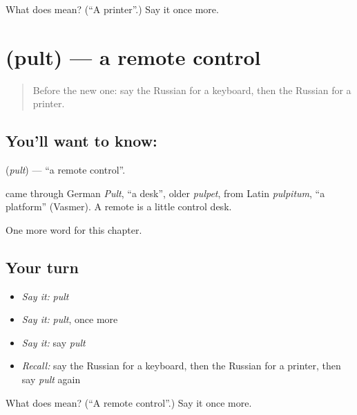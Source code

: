 \begin{tcolorbox}[breakable,colback=teal!4,colframe=teal!35!black,title={Before you move on}]
What does  mean? (\textquotedblleft{}A printer\textquotedblright{}.) Say it once more.
\end{tcolorbox}
\section[\texorpdfstring{\ru{пульт} (pult)}{пульт (pult)}]{ (pult) — a remote control}

\label{lesson:RU-C220-pult}



\begin{quote}
Before the new one: say the Russian for a keyboard, then the Russian for a printer.
\end{quote}

\subsection*{You'll want to know: }
\textbf{} (\emph{pult}) — \textquotedblleft{}a remote control\textquotedblright{}.

\begin{cousinweb}
\textbf{} came through German \emph{Pult}, \textquotedblleft{}a desk\textquotedblright{}, older \emph{pulpet}, from Latin \emph{pulpitum}, \textquotedblleft{}a platform\textquotedblright{} (Vasmer). A remote is a little control desk.
\end{cousinweb}

\begin{grammarlens}[title={What you've built}]
One more word for this chapter.
\end{grammarlens}

\subsection*{Your turn}
\begin{itemize}
\raggedright
  \item \emph{Say it:} \emph{pult}
  \item \emph{Say it:} \emph{pult}, once more
  \item \emph{Say it:} say \emph{pult}
  \item \emph{Recall:} say the Russian for a keyboard, then the Russian for a printer, then say \emph{pult} again
\end{itemize}

\begin{tcolorbox}[breakable,colback=teal!4,colframe=teal!35!black,title={Before you move on}]
What does  mean? (\textquotedblleft{}A remote control\textquotedblright{}.) Say it once more.
\end{tcolorbox}
